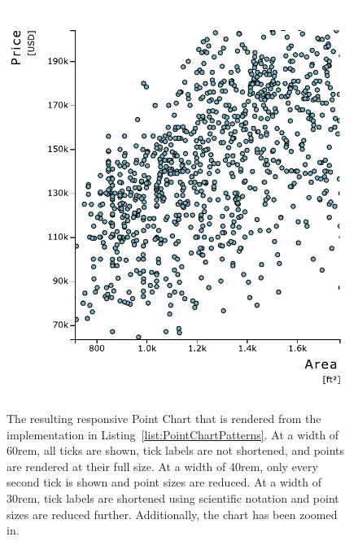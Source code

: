 \begin{figure}[tp]
{  \includegraphics[valign=b,scale=\respscale]{diagrams/respvis-point-30rem-zoomed.pdf}%
  \label{fig:PointChartPatterns30remZoomed}%
}
\caption[Responsive RespVis Point Chart]{%
The resulting responsive Point Chart that is rendered from the
implementation in Listing~\ref{list:PointChartPatterns}.
 At a width of 60rem, all ticks
are shown, tick labels are not shortened, and points are rendered at
their full size.  At a width of
40rem, only every second tick is shown and point sizes are reduced.
 At a width of 30rem, tick
labels are shortened using scientific notation and point sizes are
reduced further. Additionally, the chart has been zoomed in.
}
\label{fig:PointChartPatterns}
\end{figure}



